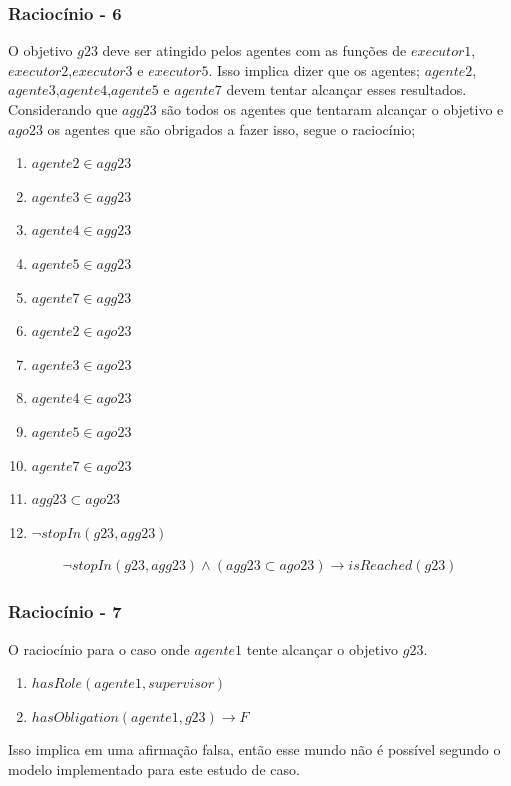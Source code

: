 \documentclass[12pt]{article}
\begin{document}
\subsubsection{Raciocínio - 6}

O objetivo $g23$ deve ser atingido pelos agentes com as funções de $executor1$,$executor2$,$executor3$ e $executor5$. Isso implica dizer que os agentes; $agente2$,$agente3$,$agente4$,$agente5$ e $agente7$ devem tentar alcançar esses resultados. Considerando que $agg23$ são todos os agentes que tentaram alcançar o objetivo e $ago23$ os agentes que são obrigados a fazer isso, segue o raciocínio;


\begin{enumerate}
	\item $agente2 \in agg23$	
	\item $agente3 \in agg23$
	\item $agente4 \in agg23$
	\item $agente5 \in agg23$
	\item $agente7 \in agg23$								
	\item $agente2 \in ago23$	
	\item $agente3 \in ago23$
	\item $agente4 \in ago23$
	\item $agente5 \in ago23$
	\item $agente7 \in ago23$	
	\item $agg23 \subset ago23$
	\item $\neg stopIn(g23,agg23)$										
\end{enumerate}

\begin{eqnarray}\label{rel15}
	\neg stopIn(g23,agg23) \wedge (agg23 \subset ago23) \to isReached(g23)
\end{eqnarray}

\subsubsection{Raciocínio - 7}

O raciocínio para o caso onde $agente1$ tente alcançar o objetivo $g23$.  

\begin{enumerate}
	\item $hasRole(agente1,supervisor)$
	\item $hasObligation(agente1,g23) \to F$										
\end{enumerate}

Isso implica em uma afirmação falsa, então esse mundo não é possível segundo o modelo implementado para este estudo de caso.
\end{document}

